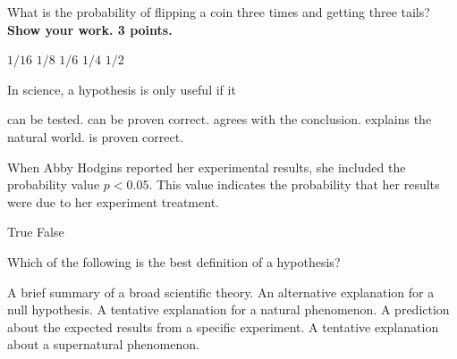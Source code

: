 \question
What is the probability of flipping a coin three times and getting three tails? \textbf{Show your work. 3 points.}

\begin{choices}
\choice $1/16$
\correctchoice $1/8$
\choice $1/6$
\choice $1/4$
\choice $1/2$
\end{choices}

\question
In science, a hypothesis is only useful if it

\begin{choices}
\correctchoice can be tested.
\choice can be proven correct.
\choice agrees with the conclusion.
\choice explains the natural world.
\choice is proven correct.
\end{choices}


\newpage

\question
When Abby Hodgins reported her experimental results, she included the probability value  $p < 0.05$.  This value indicates the probability that her results were due to her experiment treatment.

\begin{choices}
\choice True%
\correctchoice False%
\end{choices}


\question
Which of the following is the best definition of a hypothesis?

\begin{choices}
\choice A brief summary of a broad scientific theory.
\choice An alternative explanation for a null hypothesis.
\correctchoice A tentative explanation for a natural phenomenon.
\choice A prediction about the expected results from a specific experiment.
\choice A tentative explanation about a supernatural phenomenon.
\end{choices}

